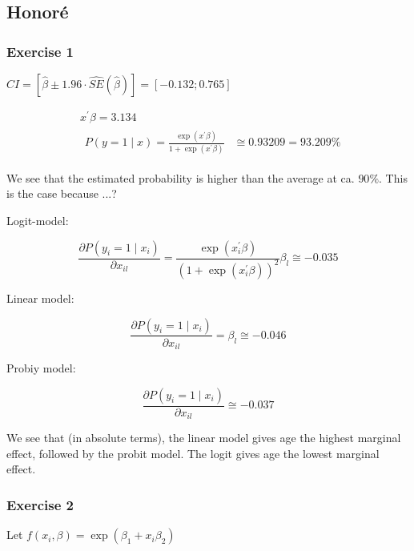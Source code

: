 \newpage
{
\subsection*{Honor\'e}

{
\subsubsection*{Exercise 1}

\begin{enumerate}[label=(\arabic*)]
{\item 
$C I=[\hat{\beta} \pm 1.96 \cdot \hat{S E}(\hat{\beta})]=[-0.132 ; 0.765]$
}
{\item 
$$
\begin{aligned}
& x^{\prime} \beta=3.134 \\
& \begin{aligned}
P(y=1 \mid x)=\frac{\exp \left(x^{\prime} \beta\right)}{1+\exp \left(x^{\prime} \beta\right)} & \cong 0.93209 =93.209 \%
\end{aligned}
\end{aligned}
$$

We see that the estimated probability is higher than the average at ca. $90 \%$. This is the case because \color{red} ...? \color{black}
}
{\item 
Logit-model:

$$
\frac{\partial P\left(y_{i}=1 \mid x_{i}\right)}{\partial x_{i l}}=\frac{\exp \left(x_{i}^\prime \beta\right)}{\left(1+\exp \left(x_{i}^\prime \beta\right)\right)^{2}} \beta_{l} \cong-0.035
$$

Linear model:

$$
\frac{\partial P\left(y_{i}=1 \mid x_{i}\right)}{\partial x_{i l}}=\beta_{l} \cong-0.046
$$

Probiy model:

$$
\frac{\partial P\left(y_{i}=1 \mid x_{i}\right)}{\partial x_{i l}} \cong-0.037
$$

We see that (in absolute terms), the linear model gives age the highest marginal effect, followed by the probit model. The logit gives age the lowest marginal effect.
}
\end{enumerate}
}
{
\subsubsection*{Exercise 2}

\begin{enumerate}[label=(\arabic*)]
{\item 
Let $f\left(x_{i}, \beta\right)=\exp \left(\beta_{1}+x_{i} \beta_{2}\right)$

}
\end{enumerate}}}
